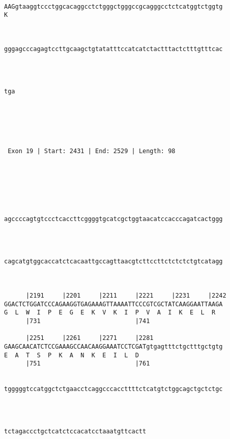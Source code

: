 \documentclass{article}
\begin{document}
\begin{Verbatim}
                                                            
AAGgtaaggtccctggcacaggcctctgggctgggccgcagggcctctcatggtctggtg
K                                                           
                                                            
   
                                                            
gggagcccagagtccttgcaagctgtatatttccatcatctactttactctttgtttcac
                                                            
                                                            
   
   
tga
   
   
  



 Exon 19 | Start: 2431 | End: 2529 | Length: 98 





   
                                                            
agccccagtgtccctcaccttcggggtgcatcgctggtaacatccacccagatcactggg
                                                            
                                                            
   
                                                            
cagcatgtggcaccatctcacaattgccagttaacgtcttccttctctctctgtcatagg
                                                            
                                                            
   
      |2191     |2201     |2211     |2221     |2231     |2242
GGACTCTGGATCCCAGAAGGTGAGAAAGTTAAAATTCCCGTCGCTATCAAGGAATTAAGA
G  L  W  I  P  E  G  E  K  V  K  I  P  V  A  I  K  E  L  R  
      |731                          |741                    
   
      |2251     |2261     |2271     |2281                   
GAAGCAACATCTCCGAAAGCCAACAAGGAAATCCTCGATgtgagtttctgctttgctgtg
E  A  T  S  P  K  A  N  K  E  I  L  D                       
      |751                          |761
   
                                                            
tgggggtccatggctctgaacctcaggcccaccttttctcatgtctggcagctgctctgc
                                                            

   
                                       
tctagaccctgctcatctccacatcctaaatgttcactt
                                       


\end{Verbatim}
\end{document}
